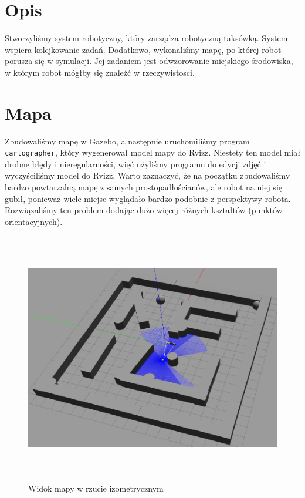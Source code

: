\documentclass[12pt]{article}
\newcommand{\vsp}{\vspace{0.5cm}}
\begin{document}


\section{Opis}

Stworzyliśmy system robotyczny, który zarządza robotyczną taksówką. System wspiera kolejkowanie zadań. Dodatkowo, wykonaliśmy mapę, po której robot porusza się w symulacji. Jej zadaniem jest odwzorowanie miejskiego środowiska, w którym robot mógłby się znaleźć w rzeczywistosci. 


\vsp
\section{Mapa}

Zbudowaliśmy mapę w Gazebo, a następnie uruchomiliśmy program \texttt{cartographer}, który wygenerował model mapy do Rvizz. Niestety ten model miał drobne błędy i nieregularności, więć użyliśmy programu do edycji zdjęć i wyczyściliśmy model do Rvizz. Warto zaznaczyć, że na początku zbudowaliśmy bardzo powtarzalną mapę z samych prostopadłościanów, ale robot na niej się gubił, ponieważ wiele miejsc wyglądało bardzo podobnie z perspektywy robota. Rozwiązaliśmy ten problem dodając dużo więcej różnych kształtów (punktów orientacyjnych). 
 
\vsp\vsp

\begin{figure}[!htb]
    \centering
    \includegraphics[height=11cm]{./images/mapa1.png}
    \caption{Widok mapy w rzucie izometrycznym}
\end{figure}
\end{document}
